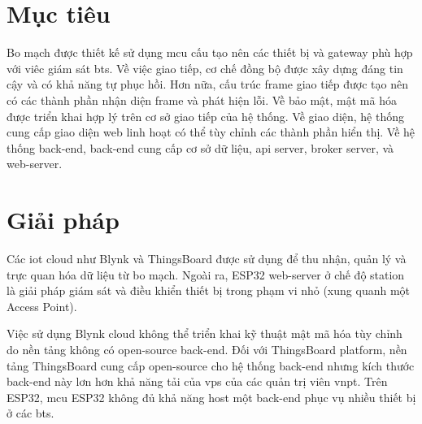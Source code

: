\section{Mục tiêu}

Bo mạch được thiết kế sử dụng \acrfull{mcu} cấu tạo nên các thiết bị và gateway phù hợp với viêc giám sát \acrshort{bts}. Về việc giao tiếp, cơ chế đồng bộ được xây dựng đáng tin cậy và có khả năng tự phục hồi. Hơn nữa, cấu trúc frame giao tiếp được tạo nên có các thành phần nhận diện frame và phát hiện lỗi. Về bảo mật, mật mã hóa được triển khai hợp lý trên cơ sở giao tiếp của hệ thống. Về giao diện, hệ thống cung cấp giao diện web linh hoạt có thể tùy chỉnh các thành phần hiển thị. Về hệ thống back-end, back-end cung cấp cơ sở dữ liệu, \acrshort{api} server, broker server, và web-server.

\section{Giải pháp}

Các \acrshort{iot} cloud như Blynk và ThingsBoard được sử dụng để thu nhận, quản lý và trực quan hóa dữ liệu từ bo mạch. Ngoài ra, ESP32 web-server ở chế độ station là giải pháp giám sát và điều khiển thiết bị trong phạm vi nhỏ (xung quanh một Access Point).

Việc sử dụng Blynk cloud không thể triển khai kỹ thuật mật mã hóa tùy chỉnh do nền tảng không có open-source back-end. Đối với ThingsBoard platform, nền tảng ThingsBoard cung cấp open-source cho hệ thống back-end nhưng kích thước back-end này lơn hơn khả năng tải của \acrshort{vps} của các quản trị viên \acrshort{vnpt}. Trên ESP32, \acrshort{mcu} ESP32 không đủ khả năng host một back-end phục vụ nhiều thiết bị ở các \acrshort{bts}.

